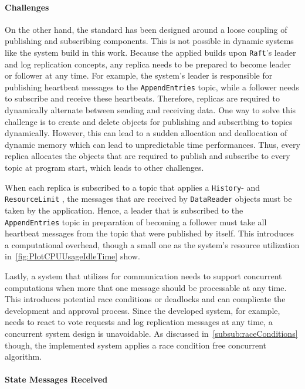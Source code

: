 \paragraph{Challenges}
On the other hand, the  standard has been designed around a loose coupling of publishing and subscribing components.
This is not possible in dynamic systems like the system build in this work.
Because the applied  builds upon \texttt{Raft}'s leader and log replication concepts, any replica needs to be prepared to become leader or follower at any time.
For example, the system's leader is responsible for publishing heartbeat messages to the \texttt{AppendEntries} topic, while a follower needs to subscribe and receive these heartbeats.
Therefore, replicas are required to dynamically alternate between sending and receiving data.
One way to solve this challenge is to create and delete objects for publishing and subscribing to topics dynamically.
However, this can lead to a sudden allocation and deallocation of dynamic memory which can lead to unpredictable time performances.
Thus, every replica allocates the objects that are required to publish and subscribe to every topic at program start, which leads to other challenges.

When each replica is subscribed to a topic that applies a \texttt{History}- and \texttt{ResourceLimit} , the messages that are received by \texttt{DataReader} objects must be taken by the application.
Hence, a leader that is subscribed to the \texttt{AppendEntries} topic in preparation of becoming a follower must take all heartbeat messages from the topic that were published by itself.
This introduces a computational overhead, though a small one as the system's resource utilization in~\autoref{fig:PlotCPUUsageIdleTime} show.

Lastly, a system that utilizes  for communication needs to support concurrent computations when more that one message should be processable at any time.
This introduces potential race conditions or deadlocks and can complicate the development and approval process.
Since the developed system, for example, needs to react to vote requests and log replication messages at any time, a concurrent system design is unavoidable.
As discussed in~\autoref{subsub:raceConditions} though, the implemented system applies a race condition free concurrent algorithm.

\iffalse
\paragraph{State Messages Received}

